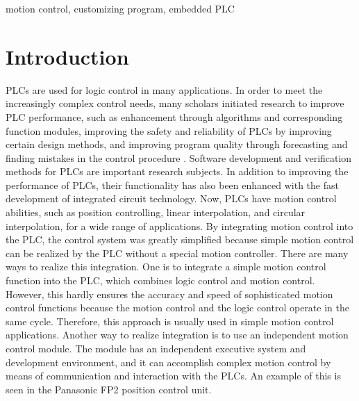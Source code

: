 \documentclass[journal]{IEEEtran}
\begin{document}
\begin{IEEEkeywords}
motion control, customizing program, embedded PLC
\end{IEEEkeywords}

%
\IEEEpeerreviewmaketitle



\section{Introduction}


PLCs are used for logic control in many applications\cite{A0,A1}. In order to meet the increasingly complex control needs, many scholars initiated research to improve PLC performance, such as enhancement through algorithms and corresponding function modules\cite{A2}, improving the safety and reliability of PLCs by improving certain design methods\cite{A3,A5,A34,A4}, and improving program quality through forecasting and finding mistakes in the control procedure \cite{A6}. Software development and verification methods for PLCs are important research subjects\cite{A42,A45,A46,A43,A44,A41}. In addition to improving the performance of PLCs, their functionality has also been enhanced with the fast development of integrated circuit technology. Now, PLCs have motion control abilities, such as position controlling, linear interpolation, and circular interpolation, for a wide range of applications\cite{A22,A18,A29,A28}. By integrating motion control into the PLC, the control system was greatly simplified because simple motion control can be realized by the PLC without a special motion controller. There are many ways to realize this integration. One is to integrate a simple motion control function into the PLC\cite{A20,A21}, which combines logic control and motion control. However, this hardly ensures the accuracy and speed of sophisticated motion control functions because the motion control and the logic control operate in the same cycle. Therefore, this approach is usually used in simple motion control applications. Another way to realize integration is to use an independent motion control module. The module has an independent executive system and development environment, and it can accomplish complex motion control by means of communication and interaction with the PLCs. An example of this is seen in the Panasonic FP2 position control unit\cite{A24}.
\end{document}
